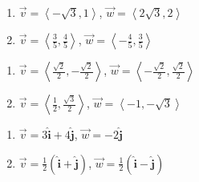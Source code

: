 \documentclass{ximera}
\begin{document}
\begin{multicols}{2}

\begin{enumerate}

\setcounter{enumi}{\value{HW}}

\item $\vec{v} = \left<-\sqrt{3}, 1\right>$, $\vec{w} = \left<2\sqrt{3}, 2\right>$
\item  $\vec{v} = \left<\frac{3}{5}, \frac{4}{5}\right>$, $\vec{w} = \left<-\frac{4}{5}, \frac{3}{5}\right>$

\setcounter{HW}{\value{enumi}}

\end{enumerate}

\end{multicols}

\begin{multicols}{2}

\begin{enumerate}

\setcounter{enumi}{\value{HW}}

\item $\vec{v} = \left<\frac{\sqrt{2}}{2}, -\frac{\sqrt{2}}{2}\right>$, $\vec{w} = \left<-\frac{\sqrt{2}}{2}, \frac{\sqrt{2}}{2} \right>$
\item $\vec{v} = \left<\frac{1}{2}, \frac{\sqrt{3}}{2}  \right>$, $\vec{w} =  \left< -1, -\sqrt{3} \right>$

\setcounter{HW}{\value{enumi}}

\end{enumerate}

\end{multicols}

\begin{multicols}{2}

\begin{enumerate}

\setcounter{enumi}{\value{HW}}

\item $\vec{v} = 3\bm\hat{\text{i}} + 4\bm\hat{\text{j}}$, $\vec{w} = -2\bm\hat{\text{j}}$
\item $\vec{v} =\frac{1}{2} \left(\bm\hat{\text{i}} + \bm\hat{\text{j}}\right)$, $\vec{w} = \frac{1}{2} \left(\bm\hat{\text{i}} - \bm\hat{\text{j}}\right)$ \label{vectorbasiclast}

\setcounter{HW}{\value{enumi}}

\end{enumerate}

\end{multicols}
\end{document}
